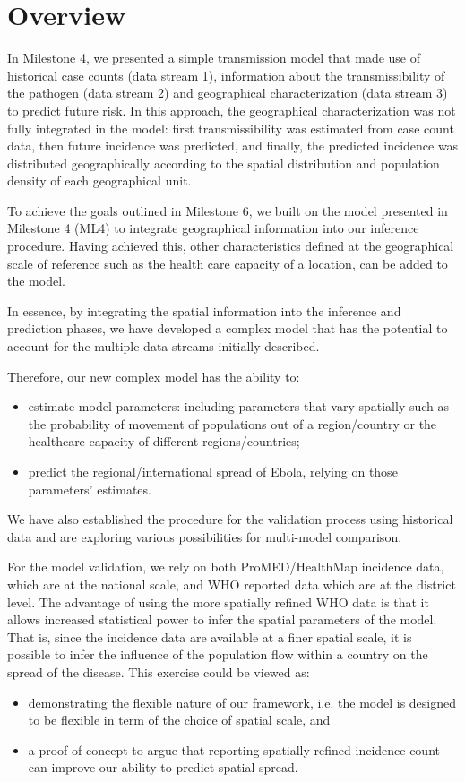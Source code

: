 \documentclass[11pt,]{article}
\begin{document}
\section{Overview}

In Milestone 4, we presented a simple transmission model that made use of
historical case counts (data stream 1), information about the
transmissibility of the pathogen (data stream 2) and geographical
characterization (data stream 3) to predict future risk. 
In this approach, the geographical characterization was not fully integrated in the model:
first transmissibility was estimated from case count data, then future incidence was predicted, and 
finally, the predicted incidence was distributed geographically according to the spatial distribution 
and population density of each geographical unit.

To achieve the goals outlined in Milestone 6, we built on the model presented in Milestone 4 
(ML4) to integrate geographical information into our inference procedure.
Having achieved this, other characteristics defined at the geographical
scale of reference such as the health care capacity of a location, can be 
added to the model.

In essence, by integrating the spatial information into the inference
and prediction phases, we have developed a complex model that has the potential to
account for the multiple data streams initially described.

Therefore, our new complex model has the ability to:
\begin{itemize}
\item estimate model parameters: including parameters that vary
  spatially such as the probability of movement of populations out of
  a region/country or the healthcare capacity of different regions/countries;
\item predict the regional/international spread of Ebola, relying on those parameters' estimates. 
\end{itemize}

We have also established the procedure for the validation process
using historical data and are exploring various possibilities for multi-model comparison. 

For the model validation, we rely on both ProMED/HealthMap incidence data, which are 
at the national scale, and WHO reported data which are at the district level. The advantage 
of using the more spatially refined WHO data is that it allows increased statistical power to 
infer the spatial parameters of the model. That is, since the
incidence data are available at a finer spatial scale, it is possible
to infer the influence of the population flow within a country on the spread of the
disease. 
This exercise could be viewed as:
\begin{itemize}
\item demonstrating the flexible nature of our framework, i.e. 
the model is designed to be flexible in term of the choice of spatial scale, and
\item a proof of concept to argue that reporting spatially refined incidence count can improve our ability to
predict spatial spread.
\end{itemize}
\end{document}
